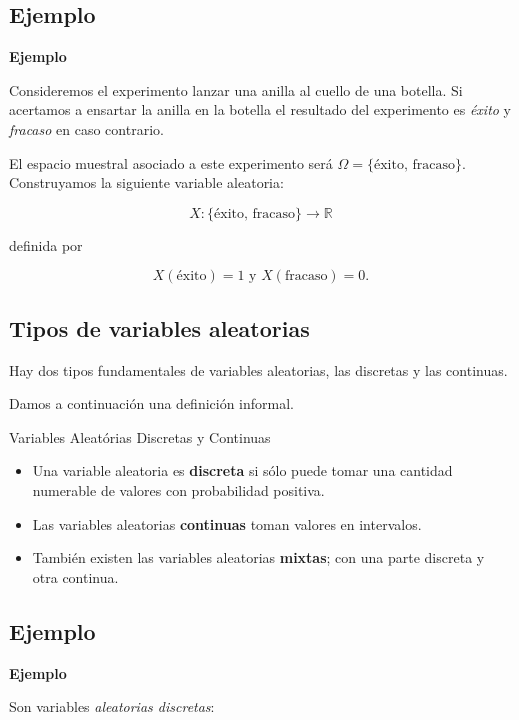\documentclass[]{book}
\providecommand{\tightlist}{%
  \setlength{\itemsep}{0pt}\setlength{\parskip}{0pt}}
\begin{document}
\hypertarget{ejemplo-3}{%
\subsection{Ejemplo}\label{ejemplo-3}}

\textbf{Ejemplo}

Consideremos el experimento lanzar una anilla al cuello de una botella. Si acertamos a
ensartar la anilla en la botella el resultado del experimento es \emph{éxito} y
\emph{fracaso} en caso contrario.

El espacio muestral asociado a este experimento será
\(\Omega=\{\mbox{éxito, fracaso}\}\). Construyamos la siguiente variable aleatoria:

\[X:\{\mbox{éxito, fracaso}\}\to\mathbb{R}\]

definida por

\[X(\mbox{éxito})=1 \mbox{ y } X(\mbox{fracaso})=0.\]

\hypertarget{tipos-de-variables-aleatorias}{%
\subsection{Tipos de variables aleatorias}\label{tipos-de-variables-aleatorias}}

Hay dos tipos fundamentales de variables aleatorias, las discretas y las continuas.

Damos a continuación una definición informal.

Variables Aleatórias Discretas y Continuas

\begin{itemize}
\tightlist
\item
  Una variable aleatoria es \textbf{discreta} si sólo puede tomar una cantidad numerable de valores con probabilidad positiva.
\item
  Las variables aleatorias \textbf{continuas} toman valores en intervalos.
\item
  También existen las variables aleatorias \textbf{mixtas}; con una parte discreta y otra continua.
\end{itemize}

\hypertarget{ejemplo-4}{%
\subsection{Ejemplo}\label{ejemplo-4}}

\textbf{Ejemplo}

Son variables \emph{aleatorias discretas}:
\end{document}
